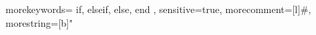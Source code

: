 \usepackage{listings}

{
	morekeywords={
		if, elseif, else, end
	},
	sensitive=true,      %
	morecomment=[l]{\#}, %
	morestring=[b]"
}

